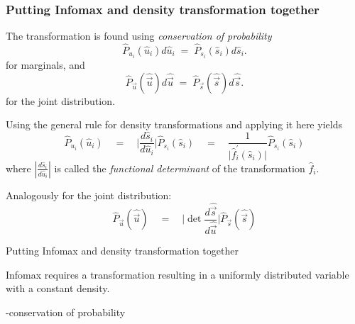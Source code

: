 \subsubsection{Putting Infomax and density transformation together}

\begin{frame}{\subsubsecname}


The transformation is found using \emph{conservation of probability}
\begin{equation}
	\widehat{P}_{u_i}(\widehat{u}_i) d \widehat{u}_i 
	\; =  \; \widehat{P}_{s_i} (\widehat{s}_i) d \widehat{s}_i.
\end{equation}
for marginals, and
\begin{equation}
	\widehat{P}_{\vec u}(\widehat{\vec u}) d \widehat{\vec u} 
	\; =  \; \widehat{P}_{\vec s} (\widehat{\vec s}) d \widehat{\vec s}.
\end{equation}
for the joint distribution.


Using the general rule for density transformations and applying it here yields
\begin{equation}
\label{eq:conservation1}
	\widehat{P}_{u_i}(\widehat{u}_i) \quad
	 =  \quad \bigg| 
		\frac{d \widehat{s}_i}{d \widehat{u}_i} \bigg| 
			 \widehat{P}_{s_i}(\widehat{s}_i) \quad
	 =  \quad \frac{1}{\big| \widehat{f}_i^{'} (\widehat{s}_i) \big|} 
		\widehat{P}_{s_i}(\widehat{s}_i)
\end{equation}
where $\left|\frac{d \widehat{s}_i}{d \widehat{u}_i} \right|$ is
called the \emph{functional determinant} of the transformation
$\widehat{f}_i$.

Analogously for the joint distribution:
\begin{equation}
\label{eq:conservation1joint}
	\widehat{P}_{\vec u}(\widehat{\vec u}) \quad
	 =  \quad \bigg| \det
		\frac{d \widehat{\vec s}}{d \widehat{\vec u}} \bigg| 
			 \widehat{P}_{\vec s}(\widehat{\vec s})
\end{equation}

\end{frame}

\begin{frame}{Putting Infomax and density transformation together}



\pause

Infomax requires a transformation resulting in a uniformly distributed
variable with a constant density.



\pause

-conservation of probability

\end{frame}

